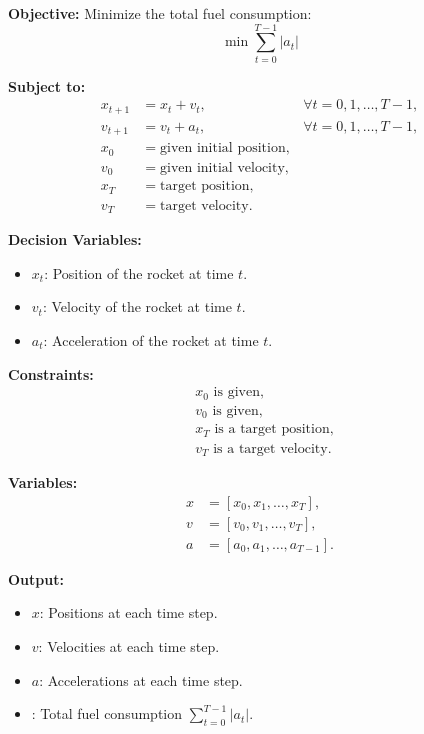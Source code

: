 \documentclass{article}
\begin{document}
\textbf{Objective:}
Minimize the total fuel consumption:
\[
\min \sum_{t=0}^{T-1} |a_t|
\]

\textbf{Subject to:}
\begin{align*}
x_{t+1} &= x_t + v_t, &\forall t = 0, 1, \ldots, T-1, \\
v_{t+1} &= v_t + a_t, &\forall t = 0, 1, \ldots, T-1, \\
x_0 &= \text{given initial position}, \\
v_0 &= \text{given initial velocity}, \\
x_T &= \text{target position}, \\
v_T &= \text{target velocity}.
\end{align*}

\textbf{Decision Variables:}
\begin{itemize}
    \item \(x_t\): Position of the rocket at time \(t\).
    \item \(v_t\): Velocity of the rocket at time \(t\).
    \item \(a_t\): Acceleration of the rocket at time \(t\).
\end{itemize}

\textbf{Constraints:}
\begin{align*}
& x_0 \text{ is given}, \\
& v_0 \text{ is given}, \\
& x_T \text{ is a target position}, \\
& v_T \text{ is a target velocity}.
\end{align*}

\textbf{Variables:}
\begin{align*}
x &= [x_0, x_1, \ldots, x_T], \\
v &= [v_0, v_1, \ldots, v_T], \\
a &= [a_0, a_1, \ldots, a_{T-1}].
\end{align*}

\textbf{Output:}
\begin{itemize}
    \item \(x\): Positions at each time step.
    \item \(v\): Velocities at each time step.
    \item \(a\): Accelerations at each time step.
    \item {}: Total fuel consumption \(\sum_{t=0}^{T-1} |a_t|\).
\end{itemize}
\end{document}
